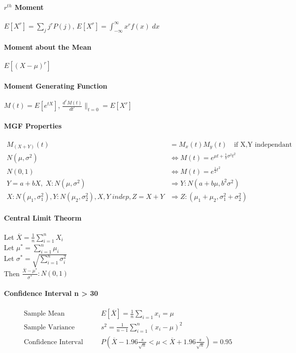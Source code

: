 
\paragraph{$r^{th}$ Moment}
$E[X^r] = \sum_j j^r P(j)$,
$E[X^r] = \int_{- \infty }^{\infty} x^r f(x) \; dx$
\paragraph{Moment about the Mean} $E[(X-\mu)^r]$
\paragraph{Moment Generating Function}
$M(t) = E[e^{tX}]$,
$\frac{d^r M(t)}{dt^r} \|_{t=0} = E[X^r]$

\paragraph{MGF Properties}
\begin{align*}
	M_{(X+Y)}(t) &= M_x(t)M_y(t) \quad \mbox{if X,Y independant} \\
	N(\mu,\sigma^2) &\iff M(t) = e^{\mu t + \frac{1}{2}\sigma^2 t^2}  \\
	N(0,1) &\iff M(t) = e^{\frac{1}{2}t^2}  \\
	Y=a+bX, \; X:N(\mu,\sigma^2) &\Rightarrow Y:N(a + b\mu,b^2\sigma^2) \\
	X:N(\mu_1,\sigma_1^2),Y:N(\mu_2,\sigma_2^2),X,Y \; indep,Z=X+Y 
		&\Rightarrow Z:(\mu_1+\mu_2,\sigma_1^2 + \sigma_2^2)
\end{align*}

\paragraph{Central Limit Theorm}
Let $\overline{X} = \frac{1}{n} \sum_{i=1}^n X_i$ \\
Let $\mu^* = \sum_{i=1}^n \mu_i$ \\
Let $\sigma^* = \sqrt{ \sum_{i=1}^n \sigma_i^2 }$ \\
Then $\frac{\overline{X} - \mu^*}{\sigma^*}:N(0,1)$

\paragraph{Confidence Interval n > 30}
\begin{align*}
	\mbox{Sample Mean} & \; & E[\overline{X}] = \frac{1}{n} \sum_{i=1} x_i  = \mu \\
	\mbox{Sample Variance} & \; &  s^2 = \frac{1}{n-1} \sum_{i=1}^n (x_i - \mu)^2 \\
	\mbox{Confidence Interval} 
		& \quad 
		&  P( \overline{X} - 1.96 \frac{s}{\sqrt{n}}< \mu < \overline{X} + 1.96 \frac{s}{\sqrt{n}}) = 0.95
\end{align*}

